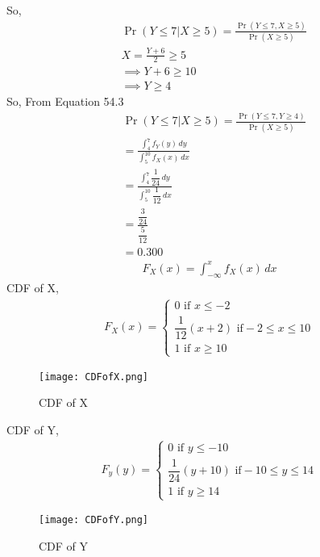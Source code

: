 \documentclass[journal,12pt,twocolumn]{IEEEtran}
\begin{document}
So,\\
\begin{align*}
\tag{54.3}
  &\Pr(Y\leq7|X\geq5)=\frac{\Pr(Y\leq7,X\geq5)}{\Pr(X\geq5)}\\
  &X=\frac{Y+6}{2}\geq5\\
  &\implies Y+6\geq10\\
  &\implies Y\geq4
\end{align*}
So,  From Equation 54.3
\begin{align*}
&\Pr(Y\leq7|X\geq5)=\frac{\Pr(Y\leq7,Y\geq4)}{\Pr(X\geq5)}\\
&=\frac{\int_{4}^{7}f_Y(y)\,dy}{\int_{5}^{10}f_X(x)\,dx}\\
&=\frac{\int_{4}^{7}\dfrac{1}{24}\,dy}{\int_{5}^{10}\dfrac{1}{12}\,dx}\\
&=\frac{\dfrac{3}{24}}{\dfrac{5}{12}}\\
&=0.300
\end{align*}
\begin{align*}
    F_X(x)=\int_{-\infty}^{x}f_X(x)\,dx
\end{align*}
CDF of X,
\begin{align*}
  F_X(x)=\begin{cases}
  0  \text{ if } x\leq-2\\
  \dfrac{1}{12}(x+2) \text{ if} -2\leq x \leq 10\\
  1 \text{  if }  x \geq 10
  \end{cases}
\end{align*}
\begin{figure}[h]
    \centering
    \texttt{[image: CDFofX.png]}
    \caption{CDF of X}
    \label{fig:my_label}
\end{figure}

CDF of Y,
\begin{align*}
  F_y(y)=\begin{cases}
  0  \text{ if } y\leq-10\\
  \dfrac{1}{24}(y+10) \text{ if} -10\leq y \leq 14\\
  1 \text{  if }  y \geq 14
  \end{cases}
\end{align*}
\begin{figure}[h]
    \centering
    \texttt{[image: CDFofY.png]}
    \caption{CDF of Y}
    \label{fig:my_label}
\end{figure}
\end{document}

